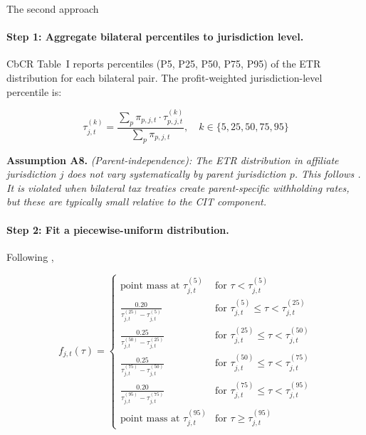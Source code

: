 \documentclass[11pt,a4paper]{article}
\newcommand{\assumption}[2]{\noindent\textbf{Assumption #1.} \textit{#2}\medskip}
\begin{document}
The second approach 

\paragraph{Step 1: Aggregate bilateral percentiles to jurisdiction level.}
CbCR Table~I reports percentiles (P5, P25, P50, P75, P95) of the ETR distribution for each bilateral pair. The profit-weighted jurisdiction-level percentile is:

\begin{equation}\label{eq:jurisdiction_percentile}
\tau_{j,t}^{(k)} = \frac{\sum_p \pi_{p,j,t} \cdot \tau_{p,j,t}^{(k)}}{\sum_p \pi_{p,j,t}}, \quad k \in \{5, 25, 50, 75, 95\}
\end{equation}

\assumption{A8}{(Parent-independence): The ETR distribution in affiliate jurisdiction $j$ does not vary systematically by parent jurisdiction $p$. This follows \citet{hugger2026}. It is violated when bilateral tax treaties create parent-specific withholding rates, but these are typically small relative to the CIT component.}

\paragraph{Step 2: Fit a piecewise-uniform distribution.}
Following \citet{hugger2026}, 

\begin{equation}\label{eq:piecewise}
f_{j,t}(\tau) = \begin{cases}
\text{point mass at } \tau_{j,t}^{(5)} & \text{for } \tau < \tau_{j,t}^{(5)} \\[4pt]
\frac{0.20}{\tau_{j,t}^{(25)} - \tau_{j,t}^{(5)}} & \text{for } \tau_{j,t}^{(5)} \leq \tau < \tau_{j,t}^{(25)} \\[4pt]
\frac{0.25}{\tau_{j,t}^{(50)} - \tau_{j,t}^{(25)}} & \text{for } \tau_{j,t}^{(25)} \leq \tau < \tau_{j,t}^{(50)} \\[4pt]
\frac{0.25}{\tau_{j,t}^{(75)} - \tau_{j,t}^{(50)}} & \text{for } \tau_{j,t}^{(50)} \leq \tau < \tau_{j,t}^{(75)} \\[4pt]
\frac{0.20}{\tau_{j,t}^{(95)} - \tau_{j,t}^{(75)}} & \text{for } \tau_{j,t}^{(75)} \leq \tau < \tau_{j,t}^{(95)} \\[4pt]
\text{point mass at } \tau_{j,t}^{(95)} & \text{for } \tau \geq \tau_{j,t}^{(95)}
\end{cases}
\end{equation}
\end{document}
